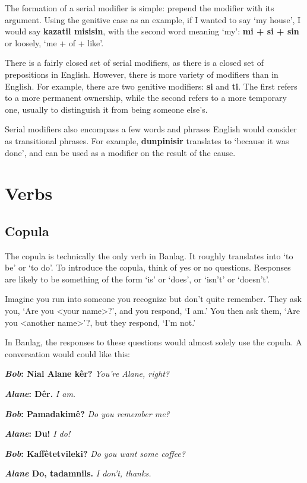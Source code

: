 \documentclass[12pt]{report}
\begin{document}
The formation of a serial modifier is simple: prepend the modifier with its argument. Using the genitive case as an example, if I wanted to say `my house', I would say \textbf{kazatil misisin}, with the second word meaning `my': \textbf{mi + si + sin} or loosely, `me + of + like'.

There is a fairly closed set of serial modifiers, as there is a closed set of prepositions in English. However, there is more variety of modifiers than in English. For example, there are two genitive modifiers: \textbf{si} and \textbf{ti}. The first refers to a more permanent ownership, while the second refers to a more temporary one, usually to distinguish it from being someone else's. 

Serial modifiers also encompass a few words and phrases English would consider as transitional phrases. For example, \textbf{dunpinisir} translates to `because it was done', and can be used as a modifier on the result of the cause. 

\chapter{Verbs}
\section{Copula}
The copula is technically the only verb in Banlag. It roughly translates into `to be' or `to do'. To introduce the copula, think of yes or no questions. Responses are likely to be something of the form `is' or `does', or `isn't' or `doesn't'.

Imagine you run into someone you recognize but don't quite remember. They ask you, `Are you <your name>?', and you respond, `I am.' You then ask them, `Are you <another name>'?, but they respond, `I'm not.'

In Banlag, the responses to these questions would almost solely use the copula. A conversation would could like this:

\textbf{\textit{Bob}: Nial Alane k\^er?} \textit{You're Alane, right?}

\textbf{\textit{Alane}: D\^ er.} \textit{I am.}

\textbf{\textit{Bob}: Pamadakim\^e?} \textit{Do you remember me?}

\textbf{\textit{Alane}: Du!} \textit{I do!}

\textbf{\textit{Bob}: Kaff\^etetvileki?} \textit{Do you want some coffee?}

\textbf{\textit{Alane} Do, tadamnils.} \textit{I don't, thanks.}
\end{document}

